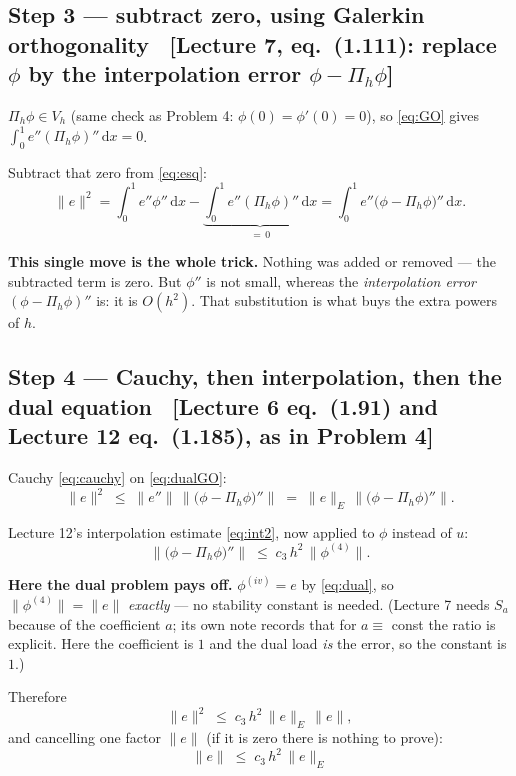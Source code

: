 \documentclass[11pt]{article}
\newcommand{\dx}{\,\mathrm{d}x}
\newcommand{\norm}[1]{\lVert #1\rVert}
\newcommand{\src}[1]{{\small\color{black!55}\textsf{[#1]}}}
\begin{document}
\subsection*{Step 3 --- subtract zero, using Galerkin orthogonality
  \ \src{Lecture 7, eq.~(1.111): replace $\phi$ by the interpolation error
         $\phi-\Pi_h\phi$}}

\begin{steps}
\item $\Pi_{h}\phi\in V_{h}$ (same check as Problem 4: $\phi(0)=\phi'(0)=0$), so
      \eqref{eq:GO} gives $\int_{0}^{1}e''(\Pi_{h}\phi)''\dx=0$.
\item Subtract that zero from \eqref{eq:esq}:
\begin{equation}\label{eq:dualGO}
  \norm{e}^{2}
   =\int_{0}^{1}e''\phi''\dx-\underbrace{\int_{0}^{1}e''(\Pi_{h}\phi)''\dx}_{=\,0}
   =\int_{0}^{1}e''\bigl(\phi-\Pi_{h}\phi\bigr)''\dx .
\end{equation}
\end{steps}

\medskip
{\small\color{black!60}\textbf{This single move is the whole trick.}  Nothing
was added or removed --- the subtracted term is zero.  But $\phi''$ is not
small, whereas the \emph{interpolation error} $(\phi-\Pi_{h}\phi)''$ is: it is
$O(h^{2})$.  That substitution is what buys the extra powers of $h$.}

\subsection*{Step 4 --- Cauchy, then interpolation, then the dual equation
  \ \src{Lecture 6 eq.~(1.91) and Lecture 12 eq.~(1.185), as in Problem 4}}

\begin{steps}
\item Cauchy \eqref{eq:cauchy} on \eqref{eq:dualGO}:
\[
  \norm{e}^{2}\;\le\;\norm{e''}\,\bigl\|\bigl(\phi-\Pi_{h}\phi\bigr)''\bigr\|
  \;=\;\norm{e}_{E}\,\bigl\|\bigl(\phi-\Pi_{h}\phi\bigr)''\bigr\| .
\]
\item Lecture 12's interpolation estimate \eqref{eq:int2}, now applied to $\phi$
      instead of $u$:
\[
  \bigl\|\bigl(\phi-\Pi_{h}\phi\bigr)''\bigr\|\;\le\;c_{3}\,h^{2}\,\norm{\phi^{(4)}} .
\]
\item \textbf{Here the dual problem pays off.}  $\phi^{(iv)}=e$ by
      \eqref{eq:dual}, so $\norm{\phi^{(4)}}=\norm{e}$ \emph{exactly} --- no
      stability constant is needed.  (Lecture 7 needs $S_{a}$ because of the
      coefficient $a$; its own note records that for $a\equiv$ const the ratio
      is explicit.  Here the coefficient is $1$ and the dual load \emph{is} the
      error, so the constant is $1$.)
\item Therefore
\[
  \norm{e}^{2}\;\le\;c_{3}\,h^{2}\,\norm{e}_{E}\,\norm{e},
\]
      and cancelling one factor $\norm{e}$ (if it is zero there is nothing to
      prove):
\begin{equation}\label{eq:L2toE}
  \boxed{\;\norm{e}\;\le\;c_{3}\,h^{2}\,\norm{e}_{E}\;}
\end{equation}
\end{steps}
\end{document}
